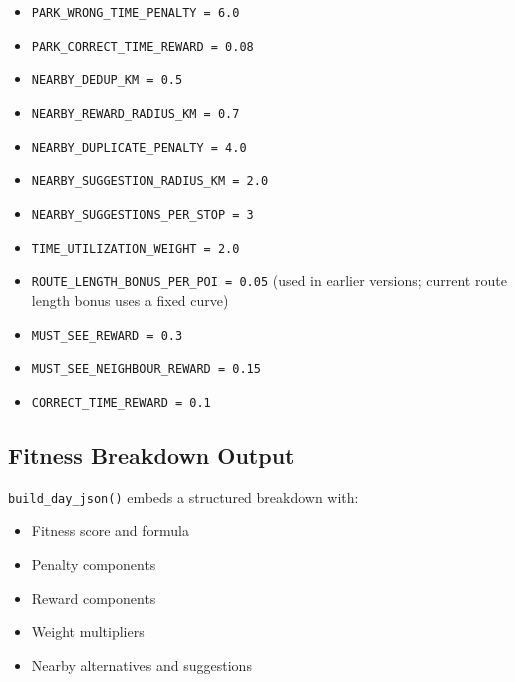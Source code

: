 \documentclass[11pt]{article}
\begin{document}
\begin{itemize}
  \item \texttt{PARK\_WRONG\_TIME\_PENALTY = 6.0}
  \item \texttt{PARK\_CORRECT\_TIME\_REWARD = 0.08}
  \item \texttt{NEARBY\_DEDUP\_KM = 0.5}
  \item \texttt{NEARBY\_REWARD\_RADIUS\_KM = 0.7}
  \item \texttt{NEARBY\_DUPLICATE\_PENALTY = 4.0}
  \item \texttt{NEARBY\_SUGGESTION\_RADIUS\_KM = 2.0}
  \item \texttt{NEARBY\_SUGGESTIONS\_PER\_STOP = 3}
  \item \texttt{TIME\_UTILIZATION\_WEIGHT = 2.0}
  \item \texttt{ROUTE\_LENGTH\_BONUS\_PER\_POI = 0.05} (used in earlier versions; current route length bonus uses a fixed curve)
  \item \texttt{MUST\_SEE\_REWARD = 0.3}
  \item \texttt{MUST\_SEE\_NEIGHBOUR\_REWARD = 0.15}
  \item \texttt{CORRECT\_TIME\_REWARD = 0.1}
\end{itemize}

\subsection{Fitness Breakdown Output}
\texttt{build\_day\_json()} embeds a structured breakdown with:
\begin{itemize}
  \item Fitness score and formula
  \item Penalty components
  \item Reward components
  \item Weight multipliers
  \item Nearby alternatives and suggestions
\end{itemize}
\end{document}
